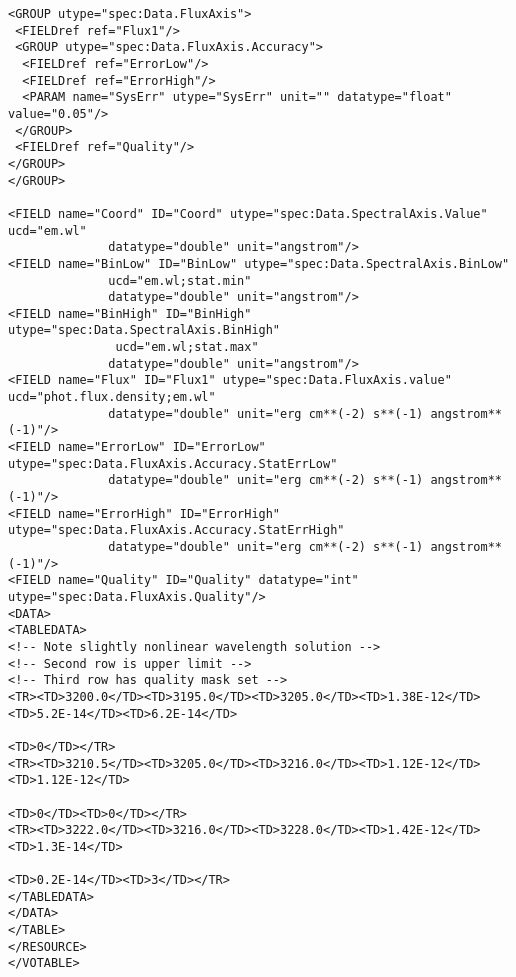 {\begin{flushleft}
\begin{fmpage}
\begin{verbatim}
\end{verbatim}
\end{fmpage}

\begin{fmpage}
\begin{verbatim}
<GROUP utype="spec:Data.FluxAxis">
 <FIELDref ref="Flux1"/>
 <GROUP utype="spec:Data.FluxAxis.Accuracy">
  <FIELDref ref="ErrorLow"/>
  <FIELDref ref="ErrorHigh"/>
  <PARAM name="SysErr" utype="SysErr" unit="" datatype="float" value="0.05"/>
 </GROUP>
 <FIELDref ref="Quality"/>
</GROUP>
</GROUP>

<FIELD name="Coord" ID="Coord" utype="spec:Data.SpectralAxis.Value" ucd="em.wl"
              datatype="double" unit="angstrom"/>
<FIELD name="BinLow" ID="BinLow" utype="spec:Data.SpectralAxis.BinLow" 
              ucd="em.wl;stat.min"
              datatype="double" unit="angstrom"/>
<FIELD name="BinHigh" ID="BinHigh" utype="spec:Data.SpectralAxis.BinHigh"
               ucd="em.wl;stat.max"
              datatype="double" unit="angstrom"/>
<FIELD name="Flux" ID="Flux1" utype="spec:Data.FluxAxis.value" ucd="phot.flux.density;em.wl"
              datatype="double" unit="erg cm**(-2) s**(-1) angstrom**(-1)"/>
<FIELD name="ErrorLow" ID="ErrorLow" utype="spec:Data.FluxAxis.Accuracy.StatErrLow" 
              datatype="double" unit="erg cm**(-2) s**(-1) angstrom**(-1)"/>
<FIELD name="ErrorHigh" ID="ErrorHigh" utype="spec:Data.FluxAxis.Accuracy.StatErrHigh" 
              datatype="double" unit="erg cm**(-2) s**(-1) angstrom**(-1)"/>
<FIELD name="Quality" ID="Quality" datatype="int" utype="spec:Data.FluxAxis.Quality"/>
<DATA>
<TABLEDATA>
<!-- Note slightly nonlinear wavelength solution -->
<!-- Second row is upper limit -->
<!-- Third row has quality mask set -->
<TR><TD>3200.0</TD><TD>3195.0</TD><TD>3205.0</TD><TD>1.38E-12</TD><TD>5.2E-14</TD><TD>6.2E-14</TD>
                                                                                    <TD>0</TD></TR>
<TR><TD>3210.5</TD><TD>3205.0</TD><TD>3216.0</TD><TD>1.12E-12</TD><TD>1.12E-12</TD>
                                                                     <TD>0</TD><TD>0</TD></TR>
<TR><TD>3222.0</TD><TD>3216.0</TD><TD>3228.0</TD><TD>1.42E-12</TD><TD>1.3E-14</TD>
                                                                     <TD>0.2E-14</TD><TD>3</TD></TR>
</TABLEDATA>
</DATA>
</TABLE>
</RESOURCE>
</VOTABLE>

\end{verbatim}
\end{fmpage}

\end{flushleft}
}
